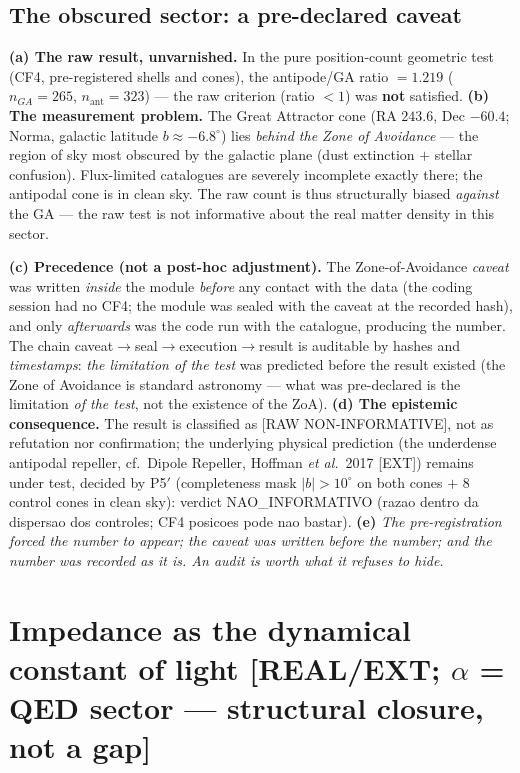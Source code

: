 \documentclass[11pt]{article}
\theoremstyle{definition}\newtheorem{deriv}{Derivation}
\begin{document}
\subsection*{The obscured sector: a pre-declared caveat}

\textbf{(a) The raw result, unvarnished.} In the pure position-count geometric test (CF4, pre-registered shells and cones), the antipode/GA ratio $=1.219$ ($n_{GA}=265$, $n_{\mathrm{ant}}=323$) --- the raw criterion (ratio $<1$) was \textbf{not} satisfied. \textbf{(b) The measurement problem.} The Great Attractor cone (RA $243{.}6$, Dec $-60{.}4$; Norma, galactic latitude $b\approx-6{.}8^\circ$) lies \emph{behind the Zone of Avoidance} --- the region of sky most obscured by the galactic plane (dust extinction $+$ stellar confusion). Flux-limited catalogues are severely incomplete exactly there; the antipodal cone is in clean sky. The raw count is thus structurally biased \emph{against} the GA --- the raw test is not informative about the real matter density in this sector.

\textbf{(c) Precedence (not a post-hoc adjustment).} The Zone-of-Avoidance \emph{caveat} was written \emph{inside} the module \emph{before} any contact with the data (the coding session had no CF4; the module was sealed with the caveat at the recorded hash), and only \emph{afterwards} was the code run with the catalogue, producing the number. The chain caveat$\to$seal$\to$execution$\to$result is auditable by hashes and \emph{timestamps}: \emph{the limitation of the test} was predicted before the result existed (the Zone of Avoidance is standard astronomy --- what was pre-declared is the limitation \emph{of the test}, not the existence of the ZoA). \textbf{(d) The epistemic consequence.} The result is classified as \textsf{[RAW NON-INFORMATIVE]}, not as refutation nor confirmation; the underlying physical prediction (the underdense antipodal repeller, cf.\ Dipole Repeller, Hoffman \emph{et al.}\ 2017 [EXT]) remains under test, decided by P5$'$ (completeness mask $|b|>10^\circ$ on both cones $+$ 8 control cones in clean sky): verdict \textsf{NAO\_INFORMATIVO (razao dentro da dispersao dos controles; CF4 posicoes pode nao bastar)}. \textbf{(e)} \emph{The pre-registration forced the number to appear; the caveat was written before the number; and the number was recorded as it is. An audit is worth what it refuses to hide.}

\section{Impedance as the dynamical constant of light \textsf{[REAL/EXT; $\alpha$ = QED sector --- structural closure, not a gap]}}
\end{document}
